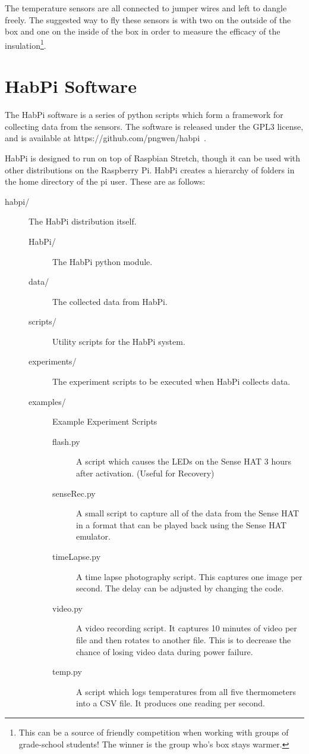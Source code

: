 \documentclass[journal]{new-aiaa}
\begin{document}
The temperature sensors are all connected to jumper wires and left to
dangle freely.  The suggested way to fly these sensors is with two on
the outside of the box and one on the inside of the box in order to
measure the efficacy of the insulation\footnote{This can be
a source of friendly competition when working with groups of
grade-school students! The winner is the group who's box stays warmer.}.

\section{HabPi Software}
The HabPi software is a series of python scripts which form
a framework for collecting data from the sensors.  The software is
released under the GPL3 license, and is available at
https://github.com/pngwen/habpi~\cite{habpi-code}.

HabPi is designed to run on top of Raspbian Stretch, though it can be
used with other distributions on the Raspberry Pi. HabPi creates
a hierarchy of folders in the home directory of the pi user.  These
are as follows:
\begin{description}
    \item[habpi/] The HabPi distribution itself.
    \begin{description}
        \item[HabPi/] The HabPi python module.
        \item[data/] The collected data from HabPi.
        \item[scripts/] Utility scripts for the HabPi system.
        \item[experiments/] The experiment scripts to be executed when
        HabPi collects data.
        \item[examples/] Example Experiment Scripts
        \begin{description}
            \item[flash.py] A script which causes the LEDs
            on the Sense HAT 3 hours after activation.  (Useful for
            Recovery)
            \item[senseRec.py] A small script to capture all of the
            data from the Sense HAT in a format that can be played
            back using the Sense HAT emulator.
            \item[timeLapse.py] A time lapse photography script.  This
            captures one image per second.  The delay can be adjusted
            by changing the code.
            \item[video.py] A video recording script.  It captures 10
            minutes of video per file and then rotates to another
            file.  This is to decrease the chance of losing video data
            during power failure.
            \item[temp.py] A script which logs temperatures from all
            five thermometers into a CSV file.  It produces one
            reading per second.
        \end{description}
    \end{description}
\end{description}
\end{document}
